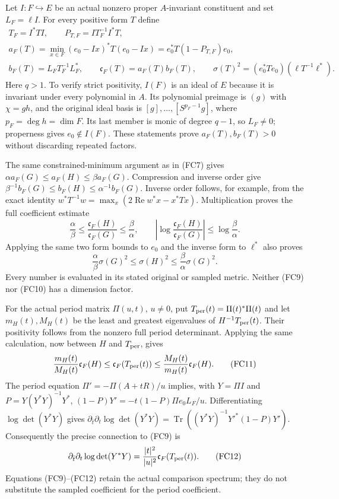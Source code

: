 Let $I:F\hookrightarrow E$ be an actual nonzero proper $A$-invariant
constituent and set $L_F=\ell I$. For every positive form $T$ define
\[
\begin{gathered}
 T_F=I^*TI,\qquad P_{T,F}=I T_F^{-1}I^*T,\\
 a_F(T)=\min_{x\in F}(e_0-Ix)^*T(e_0-Ix)
       =e_0^*T(1-P_{T,F})e_0,\\
 b_F(T)=L_F T_F^{-1}L_F^*,\qquad
 \mathfrak c_F(T)=a_F(T)b_F(T),\qquad
 \sigma(T)^2=(e_0^*Te_0)(\ell T^{-1}\ell^*).
\end{gathered}\tag{FC8}
\]
Here $q>1$. To verify strict positivity, $I(F)$ is an ideal of $E$
because it is invariant under every polynomial in $A$. Its polynomial
preimage is $(g)$ with $\chi=gh$, and the original ideal basis is
$[g],\ldots,[S^{p_F-1}g]$, where $p_F=\deg h=\dim F$.
Its last member is monic of degree $q-1$, so $L_F\ne0$; properness gives
$e_0\notin I(F)$. These statements prove $a_F(T),b_F(T)>0$ without
discarding repeated factors.

The same constrained-minimum argument as in (FC7) gives
$\alpha a_F(G)\le a_F(H)\le\beta a_F(G)$.
Compression and inverse order give
$\beta^{-1}b_F(G)\le b_F(H)\le\alpha^{-1}b_F(G)$.
Inverse order follows, for example, from the exact identity
$w^*T^{-1}w=\max_x(2\operatorname{Re}w^*x-x^*Tx)$.
Multiplication proves the full coefficient estimate
\[
 \boxed{\frac{\alpha}{\beta}\le
       \frac{\mathfrak c_F(H)}{\mathfrak c_F(G)}
           \le\frac{\beta}{\alpha},\qquad
 \left|\log\frac{\mathfrak c_F(H)}{\mathfrak c_F(G)}\right|
           \le\log\frac{\beta}{\alpha}.}
 \tag{FC9}
\]
Applying the same two form bounds to $e_0$ and the inverse form to
$\ell^*$ also proves
\[
 \frac{\alpha}{\beta}\sigma(G)^2\le\sigma(H)^2
       \le\frac{\beta}{\alpha}\sigma(G)^2.
 \tag{FC10}
\]
Every number is evaluated in its stated original or sampled metric.
Neither (FC9) nor (FC10) has a dimension factor.

For the actual period matrix $\Pi(u,t)$, $u\ne0$, put
$T_{\rm per}(t)=\Pi(t)^*\Pi(t)$ and let $m_H(t),M_H(t)$ be the least
and greatest eigenvalues of $H^{-1}T_{\rm per}(t)$. Their positivity
follows from the nonzero full period determinant. Applying the same
calculation, now between $H$ and $T_{\rm per}$, gives
\[
 \frac{m_H(t)}{M_H(t)}\mathfrak c_F(H)
 \le\mathfrak c_F(T_{\rm per}(t))
 \le\frac{M_H(t)}{m_H(t)}\mathfrak c_F(H).
 \tag{FC11}
\]
The period equation $\Pi'=-\Pi(A+tR)/u$ implies, with $Y=\Pi I$ and
$P=Y(Y^*Y)^{-1}Y^*$,
$(1-P)Y'=-t(1-P)\Pi e_0L_F/u$. Differentiating
$\log\det(Y^*Y)$ gives
$\partial_{\bar t}\partial_t\log\det(Y^*Y)
=\operatorname{Tr}((Y^*Y)^{-1}Y'^*(1-P)Y')$.
Consequently the precise connection to (FC9) is
\[
 \partial_{\bar t}\partial_t\log\det(Y^*Y)
       =\frac{|t|^2}{|u|^2}\mathfrak c_F(T_{\rm per}(t)).
 \tag{FC12}
\]
Equations (FC9)--(FC12) retain the actual comparison spectrum; they do
not substitute the sampled coefficient for the period coefficient.

